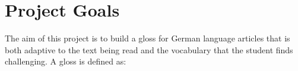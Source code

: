 \chapter{Project Goals}
The aim of this project is to build a gloss for German language articles that is both adaptive to the text being read and the vocabulary that the student finds challenging. A gloss is defined as: 

